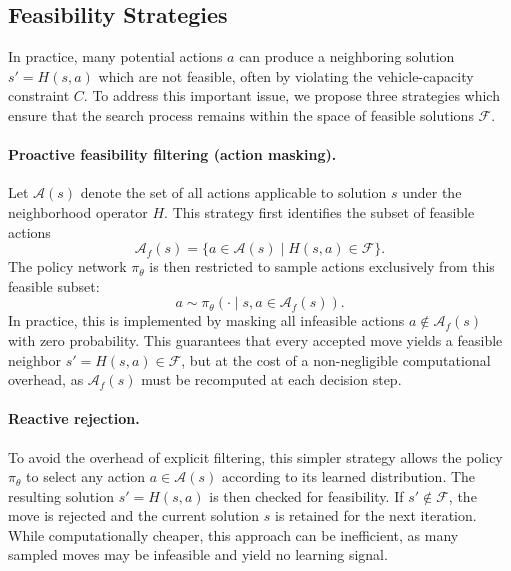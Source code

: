 \documentclass[letterpaper]{article} %
\begin{document}
\subsection{Feasibility Strategies}


In practice, many potential actions $a$ can produce a neighboring solution $s' = H(s, a)$ which are not feasible, often by violating the vehicle-capacity constraint $C$. To address this important issue, we propose three strategies which ensure that the search process remains within the space of feasible solutions $\mathcal{F}$.

\paragraph{Proactive feasibility filtering (action masking).} 
Let $\mathcal{A}(s)$ denote the set of all actions applicable to solution $s$ under the neighborhood operator $H$.
This strategy first identifies the subset of feasible actions
\begin{equation*}
\mathcal{A}_f(s) = \{ a \in \mathcal{A}(s) \mid H(s, a) \in \mathcal{F} \}.
\end{equation*}
The policy network $\pi_\theta$ is then restricted to sample actions exclusively from this feasible subset:
\begin{equation*}
a \sim \pi_\theta(\cdot \mid s, a \in \mathcal{A}_f(s)).
\end{equation*}
In practice, this is implemented by masking all infeasible actions $a \notin \mathcal{A}_f(s)$ with zero probability. This guarantees that every accepted move yields a feasible neighbor $s' = H(s, a) \in \mathcal{F}$, but at the cost of a non-negligible computational overhead, as $\mathcal{A}_f(s)$ must be recomputed at each decision step.

\paragraph{Reactive rejection.} 
To avoid the overhead of explicit filtering, this simpler strategy allows the policy $\pi_\theta$ to select any action $a \in \mathcal{A}(s)$ according to its learned distribution. The resulting solution $s' = H(s, a)$ is then checked for feasibility. 
If $s' \notin \mathcal{F}$, the move is rejected and the current solution $s$ is retained for the next iteration. While computationally cheaper, this approach can be inefficient, as many sampled moves may be infeasible and yield no learning signal.
\end{document}
